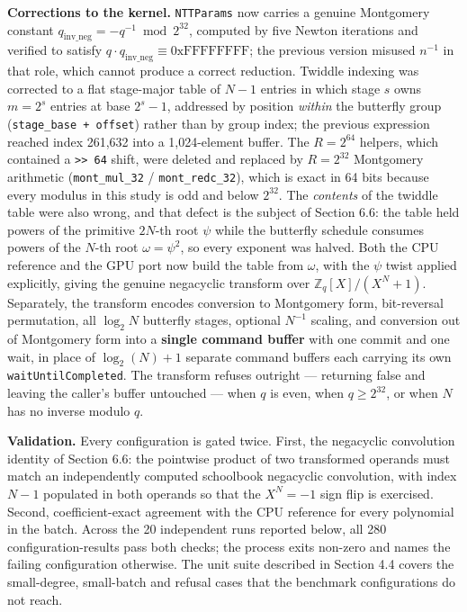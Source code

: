 \textbf{Corrections to the kernel.} \texttt{NTTParams} now carries a genuine Montgomery constant \(q_{\text{inv\_neg}} = -q^{-1} \bmod 2^{32}\), computed by five Newton iterations and verified to satisfy \(q \cdot q_{\text{inv\_neg}} \equiv \text{0xFFFFFFFF}\); the previous version misused \(n^{-1}\) in that role, which cannot produce a correct reduction. Twiddle indexing was corrected to a flat stage-major table of \(N - 1\) entries in which stage \(s\) owns \(m = 2^s\) entries at base \(2^s - 1\), addressed by position \emph{within} the butterfly group (\texttt{stage\_base\ +\ offset}) rather than by group index; the previous expression reached index 261,632 into a 1,024-element buffer. The \(R = 2^{64}\) helpers, which contained a \texttt{\textgreater{}\textgreater{}\ 64} shift, were deleted and replaced by \(R = 2^{32}\) Montgomery arithmetic (\texttt{mont\_mul\_32} / \texttt{mont\_redc\_32}), which is exact in 64 bits because every modulus in this study is odd and below \(2^{32}\). The \emph{contents} of the twiddle table were also wrong, and that defect is the subject of Section 6.6: the table held powers of the primitive \(2N\)-th root \(\psi\) while the butterfly schedule consumes powers of the \(N\)-th root \(\omega = \psi^2\), so every exponent was halved. Both the CPU reference and the GPU port now build the table from \(\omega\), with the \(\psi\) twist applied explicitly, giving the genuine negacyclic transform over \(\mathbb{Z}_q[X]/(X^N + 1)\). Separately, the transform encodes conversion to Montgomery form, bit-reversal permutation, all \(\log_2 N\) butterfly stages, optional \(N^{-1}\) scaling, and conversion out of Montgomery form into a \textbf{single command buffer} with one commit and one wait, in place of \(\log_2(N) + 1\) separate command buffers each carrying its own \texttt{waitUntilCompleted}. The transform refuses outright --- returning false and leaving the caller's buffer untouched --- when \(q\) is even, when \(q \geq 2^{32}\), or when \(N\) has no inverse modulo \(q\).

\textbf{Validation.} Every configuration is gated twice. First, the negacyclic convolution identity of Section 6.6: the pointwise product of two transformed operands must match an independently computed schoolbook negacyclic convolution, with index \(N - 1\) populated in both operands so that the \(X^N = -1\) sign flip is exercised. Second, coefficient-exact agreement with the CPU reference for every polynomial in the batch. Across the 20 independent runs reported below, all 280 configuration-results pass both checks; the process exits non-zero and names the failing configuration otherwise. The unit suite described in Section 4.4 covers the small-degree, small-batch and refusal cases that the benchmark configurations do not reach.

